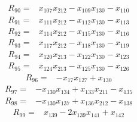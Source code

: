 \begin{equation*}\begin{split}
R_{90}={}&x_{107} x_{212} - x_{109} x_{130} - x_{110}
\end{split}\end{equation*}
\begin{equation*}\begin{split}
R_{91}={}&x_{111} x_{212} - x_{112} x_{130} - x_{113}
\end{split}\end{equation*}
\begin{equation*}\begin{split}
R_{92}={}&x_{114} x_{212} - x_{115} x_{130} - x_{116}
\end{split}\end{equation*}
\begin{equation*}\begin{split}
R_{93}={}&x_{117} x_{212} - x_{118} x_{130} - x_{119}
\end{split}\end{equation*}
\begin{equation*}\begin{split}
R_{94}={}&x_{120} x_{213} - x_{122} x_{130} - x_{123}
\end{split}\end{equation*}
\begin{equation*}\begin{split}
R_{95}={}&x_{124} x_{213} - x_{125} x_{130} - x_{126}
\end{split}\end{equation*}
\begin{equation*}\begin{split}
R_{96}={}&-x_{17} x_{127} + x_{130}
\end{split}\end{equation*}
\begin{equation*}\begin{split}
R_{97}={}&-x_{130} x_{134} + x_{133} x_{211} - x_{135}
\end{split}\end{equation*}
\begin{equation*}\begin{split}
R_{98}={}&-x_{130} x_{137} + x_{136} x_{212} - x_{138}
\end{split}\end{equation*}
\begin{equation*}\begin{split}
R_{99}={}&x_{139} - 2x_{139} x_{141} + x_{142}
\end{split}\end{equation*}
